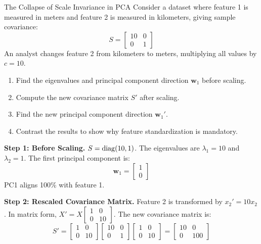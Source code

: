 \begin{examplebox}{The Collapse of Scale Invariance in PCA}
Consider a dataset where feature 1 is measured in meters and feature 2 is measured in kilometers, giving sample covariance:
\begin{equation}
S = \begin{bmatrix} 10 & 0 \\ 0 & 1 \end{bmatrix}
\end{equation}
An analyst changes feature 2 from kilometers to meters, multiplying all values by $c = 10$.
\begin{enumerate}
    \item Find the eigenvalues and principal component direction $\mathbf{w}_1$ before scaling.
    \item Compute the new covariance matrix $S'$ after scaling.
    \item Find the new principal component direction $\mathbf{w}_1'$.
    \item Contrast the results to show why feature standardization is mandatory.
\end{enumerate}

\textbf{Step 1: Before Scaling.}
$S = \operatorname{diag}(10, 1)$. The eigenvalues are $\lambda_1 = 10$ and $\lambda_2 = 1$.
The first principal component is:
\begin{equation}
\mathbf{w}_1 = \begin{bmatrix} 1 \\ 0 \end{bmatrix}
\end{equation}
PC1 aligns 100\% with feature 1.

\textbf{Step 2: Rescaled Covariance Matrix.}
Feature 2 is transformed by $x_2' = 10 x_2$. In matrix form, $X' = X \begin{bmatrix} 1 & 0 \\ 0 & 10 \end{bmatrix}$. The new covariance matrix is:
\begin{equation}
S' = \begin{bmatrix} 1 & 0 \\ 0 & 10 \end{bmatrix} \begin{bmatrix} 10 & 0 \\ 0 & 1 \end{bmatrix} \begin{bmatrix} 1 & 0 \\ 0 & 10 \end{bmatrix} = \begin{bmatrix} 10 & 0 \\ 0 & 100 \end{bmatrix}
\end{equation}


\end{examplebox}
